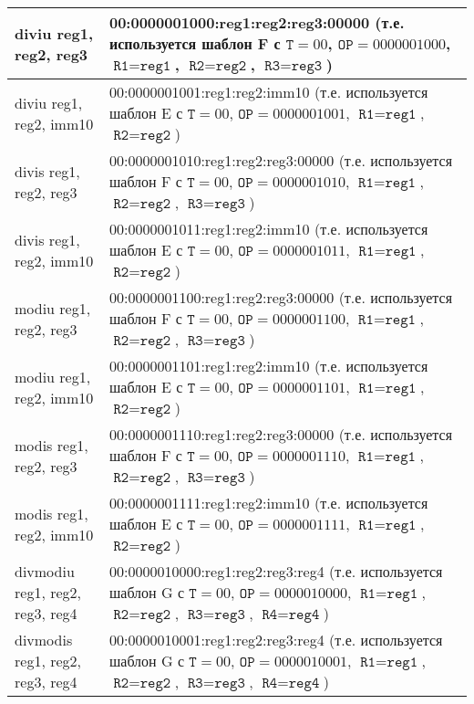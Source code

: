 \documentclass[10pt]{report}
\begin{document}
\begin{longtable}[c]{|l|p{12.5cm}|}
diviu reg1, reg2, reg3          & 00:0000001000:reg1:reg2:reg3:00000 (т.е. используется шаблон F с $\texttt{T}=00$, $\texttt{OP}=0000001000$, $\texttt{R1}=\texttt{reg1}$, $\texttt{R2}=\texttt{reg2}$,  $\texttt{R3}=\texttt{reg3}$) \\ \hline
diviu reg1, reg2, imm10         & 00:0000001001:reg1:reg2:imm10 (т.е. используется шаблон E с $\texttt{T}=00$, $\texttt{OP}=0000001001$, $\texttt{R1}=\texttt{reg1}$, $\texttt{R2}=\texttt{reg2}$) \\ \hline
divis reg1, reg2, reg3          & 00:0000001010:reg1:reg2:reg3:00000 (т.е. используется шаблон F с $\texttt{T}=00$, $\texttt{OP}=0000001010$, $\texttt{R1}=\texttt{reg1}$, $\texttt{R2}=\texttt{reg2}$,  $\texttt{R3}=\texttt{reg3}$) \\ \hline
divis reg1, reg2, imm10         & 00:0000001011:reg1:reg2:imm10 (т.е. используется шаблон E с $\texttt{T}=00$, $\texttt{OP}=0000001011$, $\texttt{R1}=\texttt{reg1}$, $\texttt{R2}=\texttt{reg2}$) \\ \hline
modiu reg1, reg2, reg3          & 00:0000001100:reg1:reg2:reg3:00000 (т.е. используется шаблон F с $\texttt{T}=00$, $\texttt{OP}=0000001100$, $\texttt{R1}=\texttt{reg1}$, $\texttt{R2}=\texttt{reg2}$,  $\texttt{R3}=\texttt{reg3}$) \\ \hline
modiu reg1, reg2, imm10         & 00:0000001101:reg1:reg2:imm10 (т.е. используется шаблон E с $\texttt{T}=00$, $\texttt{OP}=0000001101$, $\texttt{R1}=\texttt{reg1}$, $\texttt{R2}=\texttt{reg2}$) \\ \hline
modis reg1, reg2, reg3          & 00:0000001110:reg1:reg2:reg3:00000 (т.е. используется шаблон F с $\texttt{T}=00$, $\texttt{OP}=0000001110$, $\texttt{R1}=\texttt{reg1}$, $\texttt{R2}=\texttt{reg2}$,  $\texttt{R3}=\texttt{reg3}$) \\ \hline
modis reg1, reg2, imm10         & 00:0000001111:reg1:reg2:imm10 (т.е. используется шаблон E с $\texttt{T}=00$, $\texttt{OP}=0000001111$, $\texttt{R1}=\texttt{reg1}$, $\texttt{R2}=\texttt{reg2}$) \\ \hline
divmodiu reg1, reg2, reg3, reg4 & 00:0000010000:reg1:reg2:reg3:reg4 (т.е. используется шаблон G с $\texttt{T}=00$, $\texttt{OP}=0000010000$, $\texttt{R1}=\texttt{reg1}$, $\texttt{R2}=\texttt{reg2}$,  $\texttt{R3}=\texttt{reg3}$, $\texttt{R4}=\texttt{reg4}$) \\ \hline
divmodis reg1, reg2, reg3, reg4  & 00:0000010001:reg1:reg2:reg3:reg4 (т.е. используется шаблон G с $\texttt{T}=00$, $\texttt{OP}=0000010001$, $\texttt{R1}=\texttt{reg1}$, $\texttt{R2}=\texttt{reg2}$,  $\texttt{R3}=\texttt{reg3}$, $\texttt{R4}=\texttt{reg4}$) \\ \hline

\end{longtable}
\end{document}
